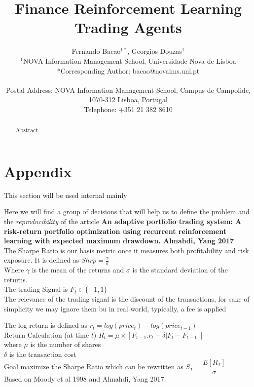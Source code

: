 \documentclass[parskip=full]{scrartcl}
\title{Finance Reinforcement Learning \\ \LARGE{Trading Agents}}
\author{
	Fernando Bacao\(^{1*}\), Georgios Douzas\(^{1}\)
	\\
	\small{\(^{1}\)NOVA Information Management School, Universidade Nova de Lisboa}
	\\
	\small{*Corresponding Author: bacao@novaims.unl.pt}
	\\
	\\
	\small{Postal Address: NOVA Information Management School, Campus de Campolide, 1070-312 Lisboa, Portugal}
	\\
	\small{Telephone: +351 21 382 8610}
}
\date{}
\begin{document}
\maketitle

\begin{abstract}
Abstract.
\end{abstract}

\section{Appendix}

This section will be used internal mainly\par

Here we will find a group of decisions that will help us to define the problem and the \textit{reproducibility} of the article
\textbf{An adaptive portfolio trading system: A risk-return portfolio optimization using recurrent reinforcement learning with expected maximum drawdown. Almahdi, Yang 2017 }\\


The Sharpe Ratio is our basis metric once it measures both profitability and risk exposure. It is defined as $ Shrp = \frac{\gamma}{\sigma}$\\

Where $\gamma$ is the mean of the returns and $\sigma$ is the standard deviation of the returns.\\

The trading Signal is $F_t \in \{-1,1\}$\\
The relevance of the trading signal is the discount of the transactions, for sake of simplicity we may ignore them bu in real world, typically, a fee is applied

The log return is defined as $ r_t = log(price_t) - log(price_{t-1})$\\

Return Calculation (at time $ t $)
$ R_t = \mu \times [F_{t-1}.r_t - \delta|F_t-F_{t-1}|]$\\
where $\mu$ is the number of shares\\
$\delta$ is the transaction cost\\

Goal maximize the Sharpe Ratio which can be rewritten as $ S_T = \dfrac{E[R_T]}{\sigma}$\\

Based on Moody et al 1998 and Almahdi, Yang 2017\\
\end{document}
